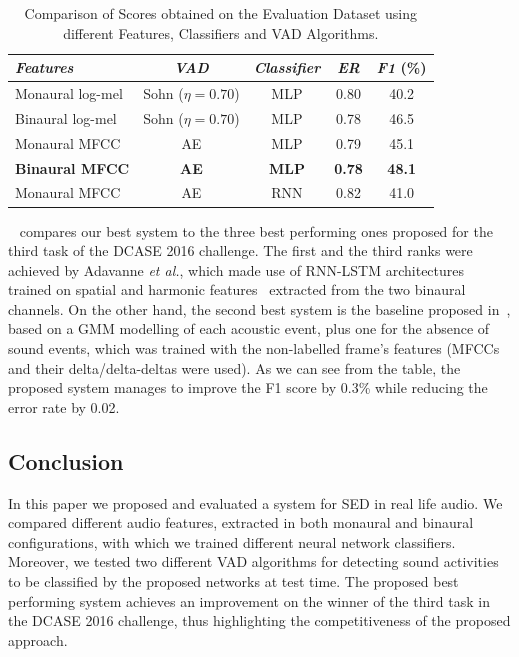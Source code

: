 \begin{table}[h]
	\centering
	\begin{tabular}{l c c c c}\toprule
		\emph{Features} & \emph{VAD} & \emph{Classifier} & \emph{ER} & \emph{F1} (\%)\\
		\midrule
		Monaural log-mel & Sohn ($\eta=0.70$) & MLP & 0.80 & 40.2\\
		Binaural log-mel & Sohn ($\eta=0.70$) & MLP & 0.78 & 46.5\\
		\midrule
		Monaural MFCC & AE & MLP & 0.79 & 45.1\\
		\textbf{Binaural MFCC} & \textbf{AE} & \textbf{MLP} & \textbf{0.78} & \textbf{48.1}\\
		\midrule
		Monaural MFCC & AE & RNN & 0.82 & 41.0\\
		\bottomrule
	\end{tabular}
	\caption[Sound Event Detection - DCASE 2016 - Best Results]{Comparison of Scores obtained on the Evaluation Dataset using different Features, Classifiers and VAD Algorithms.}
	\label{tab:eval_results}
\end{table}


~ compares our best system to the three best performing ones proposed for the third task of the DCASE 2016 challenge. The first and the third ranks were achieved by Adavanne \emph{et al.}, which made use of RNN-LSTM architectures trained on spatial and harmonic features~\cite{adavanne2016sound} extracted from the two binaural channels. On the other hand, the second best system is the baseline proposed in~\cite{mesaros2016tut}, based on a GMM modelling of each acoustic event, plus one for the absence of sound events, which was trained with the non-labelled frame's features (MFCCs and their delta/delta-deltas were used). As we can see from the table, the proposed system manages to improve the F1 score by 0.3\% while reducing the error rate by 0.02.

\subsection{Conclusion}

In this paper we proposed and evaluated a system for SED in real life audio. We compared different audio features, extracted in both monaural and binaural configurations, with which we trained different neural network classifiers. Moreover, we tested two different VAD algorithms for detecting sound activities to be classified by the proposed networks at test time. The proposed best performing system achieves an improvement on the winner of the third task in the DCASE 2016 challenge, thus highlighting the competitiveness of the proposed approach. 


